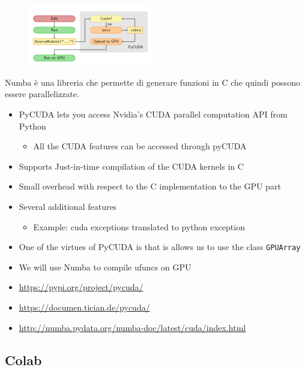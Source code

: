 \begin{figure}
	\begin{center}
		\includegraphics[width=0.48\textwidth]{figure_parallel/pycuda.png}
	\end{center}
\end{figure}

Numba è una libreria che permette di generare funzioni in C che quindi possono essere parallelizzate.

\begin{itemize}
	\item PyCUDA lets you access Nvidia's CUDA parallel
	computation API from Python
	\begin{itemize}
		\item All the CUDA features can be accessed through pyCUDA
	\end{itemize}
	\item Supports Just-in-time compilation of the CUDA kernels in C
	\item Small overhead with respect to the C implementation to the GPU part
	\item Several additional features
	\begin{itemize}
		\item Example: cuda exceptions translated to python exception
	\end{itemize}
	\item One of the virtues of PyCUDA is that is allows us to use the class \texttt{GPUArray}
	\item We will use Numba to compile ufuncs on GPU
	\item \url{https://pypi.org/project/pycuda/}
	\item \url{https://documen.tician.de/pycuda/}
	\item \url{http://numba.pydata.org/numba-doc/latest/cuda/index.html}
\end{itemize}





\subsection{Colab}

